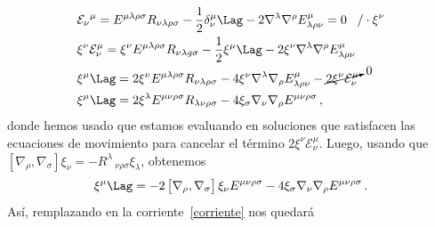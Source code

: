 \documentclass[../Main.tex]{subfiles}
\begin{document}
\begin{align}\notag
&\mathcal{E}_{\nu}{^\mu}=E^{\mu \lambda \rho\sigma} R_{\nu \lambda \rho \sigma}-\frac{1}{2} \delta_\nu^\mu \Lag-2 \nabla^{\lambda} \nabla^{\rho} E^{\mu}_{\lambda \rho \nu}=0 \,\,\,\,\, / \cdot \xi^{\nu}\\ \notag
&\xi^{\nu} \mathcal{E}_{\nu}^{\mu}=\xi^{\nu} E^{\mu \lambda \rho \sigma} R_{\nu \lambda g \sigma}-\frac{1}{2} \xi^{\mu} \Lag-2 \xi^{\nu} \nabla^{\lambda} \nabla^{\rho} E^{\mu}_{\lambda\rho\nu}\\ \notag
& \xi^{\mu} \Lag=2 \xi^{\nu} E^{\mu \lambda \rho \sigma} R_{\nu \lambda \rho \sigma}-4 \xi^{\nu} \nabla^{\lambda} \nabla_{\rho} E^{\mu}_{\lambda\rho\nu} -\cancelto{0}{2\xi^{\nu} \mathcal{E}^{\mu}_{\nu}}\\
&\xi^{\mu}\Lag=2\xi{^\lambda} E^{\mu \nu \rho\sigma} R_{\lambda \nu \rho \sigma}-4 \xi_{\sigma} \nabla_{\nu} \nabla_{\rho} E^{\mu \nu \rho \sigma} \, ,
\end{align}
donde hemos usado que estamos evaluando en soluciones que satisfacen las ecuaciones de movimiento para cancelar el término $2\xi^{\nu} \mathcal{E}^{\mu}_{\nu}$. Luego, usando que $[\nabla_{\rho},\nabla_{\sigma}]\xi_{\nu}=-R^{\lambda}\,_{\nu\rho\sigma} \xi_{\lambda}$, obtenemos 
\begin{align}
    \xi^{\mu} \Lag=-2\left[\nabla_{\rho}, \nabla_{\sigma}\right] \xi_{\nu} E^{\mu \nu\rho \sigma} -4 \xi_{\sigma} \nabla_{\nu} \nabla_{\rho} E^{\mu \nu \rho \sigma}\, .
\end{align}
Así, remplazando en la corriente~\eqref{corriente} nos quedará
\end{document}
